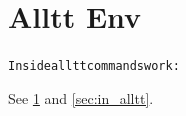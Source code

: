\documentclass{article}
\begin{document}
\section{Alltt Env}\label{sec:alltt_sec}
\begin{alltt}
Inside alltt commands work: \cite{k1} \label{sec:in_alltt}
\end{alltt}
See \ref{sec:alltt_sec} and \ref{sec:in_alltt}.


\end{document}
